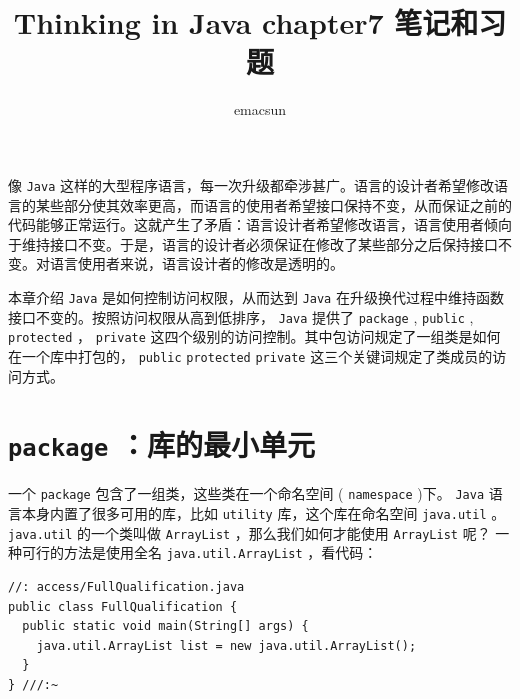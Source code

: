 \documentclass[10pt,a4paper,UTF8]{article}
\author{emacsun}
\date{}
\title{Thinking in Java chapter7 笔记和习题}
\begin{document}
\maketitle
\tableofcontents
{}
像 \texttt{Java} 这样的大型程序语言，每一次升级都牵涉甚广。语言的设计者希望修改语言的某些部分使其效率更高，而语言的使用者希望接口保持不变，从而保证之前的代码能够正常运行。这就产生了矛盾：语言设计者希望修改语言，语言使用者倾向于维持接口不变。于是，语言的设计者必须保证在修改了某些部分之后保持接口不变。对语言使用者来说，语言设计者的修改是透明的。

本章介绍 \texttt{Java} 是如何控制访问权限，从而达到 \texttt{Java} 在升级换代过程中维持函数接口不变的。按照访问权限从高到低排序， \texttt{Java} 提供了 \texttt{package} , \texttt{public} , \texttt{protected} ， \texttt{private} 这四个级别的访问控制。其中包访问规定了一组类是如何在一个库中打包的， \texttt{public} \texttt{protected} \texttt{private} 这三个关键词规定了类成员的访问方式。

\section{\texttt{package} ：库的最小单元}
\label{sec:org4bbfc20}


一个 \texttt{package} 包含了一组类，这些类在一个命名空间 ( \texttt{namespace} )下。 \texttt{Java} 语言本身内置了很多可用的库，比如 \texttt{utility} 库，这个库在命名空间 \texttt{java.util} 。 \texttt{java.util} 的一个类叫做 \texttt{ArrayList} ，那么我们如何才能使用 \texttt{ArrayList} 呢？ 一种可行的方法是使用全名 \texttt{java.util.ArrayList} ，看代码：
\lstset{language=C,label= ,caption= ,captionpos=b,numbers=none}
\begin{lstlisting}
//: access/FullQualification.java
public class FullQualification {
  public static void main(String[] args) {
    java.util.ArrayList list = new java.util.ArrayList();
  }
} ///:~
\end{lstlisting}
\end{document}
